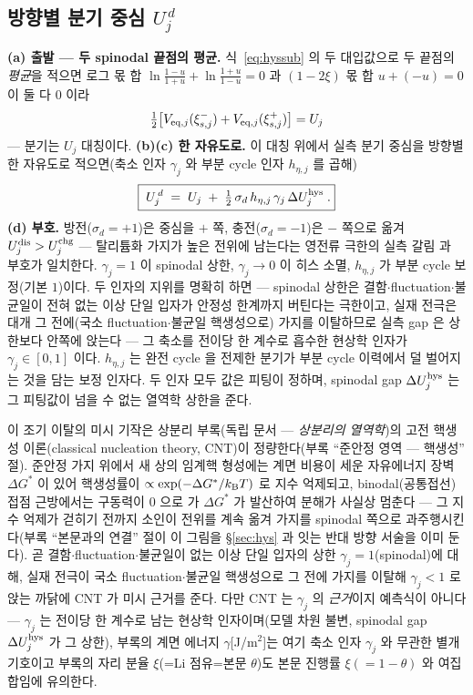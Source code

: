 \subsection{방향별 분기 중심 $U_j^{\,d}$}\label{sec:hys-branch}
\textbf{(a) 출발 --- 두 spinodal 끝점의 평균.} 식~\eqref{eq:hyssub} 의 두 대입값으로 두 끝점의 \emph{평균}을 적으면
로그 몫 합 $\ln\frac{1-u}{1+u}+\ln\frac{1+u}{1-u}=0$ 과 $(1-2\xi)$ 몫 합 $u+(-u)=0$ 이 둘 다 $0$ 이라
\begin{equation}
\tfrac12\big[V_{\mathrm{eq},j}(\xi_{s,j}^-)+V_{\mathrm{eq},j}(\xi_{s,j}^+)\big]=U_j
\label{eq:hyssym}
\end{equation}
--- 분기는 $U_j$ 대칭이다. \textbf{(b)(c) 한 자유도로.} 이 대칭 위에서 실측 분기 중심을 방향별 한 자유도로 적으면(축소
인자 $\gamma_j$ 와 부분 cycle 인자 $h_{\eta,j}$ 를 곱해)
\begin{equation}
\boxed{\;U_j^{\,d}\;=\;U_j\;+\;\tfrac12\,\sigma_d\,h_{\eta,j}\,\gamma_j\,\Delta U_j^{\mathrm{hys}}\;.}
\label{eq:Ubranch}
\end{equation}
\textbf{(d) 부호.} 방전($\sigma_d=+1$)은 중심을
$+$ 쪽, 충전($\sigma_d=-1$)은 $-$ 쪽으로 옮겨 $U_j^{\mathrm{dis}}>U_j^{\mathrm{chg}}$ --- 탈리튬화 가지가 높은 전위에
남는다는 영전류 극한의 실측 갈림\cite{dreyer2010} 과 부호가 일치한다.
$\gamma_j=1$ 이 spinodal 상한, $\gamma_j\to0$ 이 히스 소멸, $h_{\eta,j}$ 가 부분 cycle 보정(기본 $1$)이다.
두 인자의 지위를 명확히 하면 --- spinodal 상한은 결함$\cdot$fluctuation$\cdot$불균일이 전혀 없는 이상 단일 입자가
안정성 한계까지 버틴다는 극한이고, 실재 전극은 대개 그 전에(국소 fluctuation$\cdot$불균일 핵생성으로) 가지를
이탈하므로 실측 gap 은 상한보다 안쪽에 앉는다 --- 그 축소를 전이당 한 계수로 흡수한 현상학 인자가
$\gamma_j\in[0,1]$ 이다. $h_{\eta,j}$ 는 완전 cycle 을 전제한 분기가 부분 cycle 이력에서 덜 벌어지는 것을
담는 보정 인자다. 두 인자 모두 값은 피팅이 정하며, spinodal gap $\Delta U_j^{\mathrm{hys}}$ 는 그 피팅값이 넘을 수
없는 열역학 상한을 준다.

이 조기 이탈의 미시 기작은 상분리 부록(독립 문서 --- \emph{상분리의 열역학})의 고전 핵생성
이론(classical nucleation theory, CNT)이 정량한다(부록 ``준안정 영역 --- 핵생성'' 절). 준안정
가지 위에서 새 상의 임계핵 형성에는 계면 비용이 세운 자유에너지 장벽 $\Delta G^\ast$ 이 있어
핵생성률이 $\propto\exp(-\Delta G^\ast/k_{\mathrm B} T)$ 로 지수 억제되고, binodal(공통접선) 접점 근방에서는
구동력이 $0$ 으로 가 $\Delta G^\ast$ 가 발산하여 분해가 사실상 멈춘다 --- 그 지수 억제가 걷히기
전까지 소인이 전위를 계속 옮겨 가지를 spinodal 쪽으로 과주행시킨다(부록 ``본문과의 연결'' 절이 이
그림을 \S\ref{sec:hys} 과 잇는 반대 방향 서술을 이미 둔다). 곧 결함$\cdot$fluctuation$\cdot$불균일이 없는
이상 단일 입자의 상한 $\gamma_j=1$(spinodal)에 대해, 실재 전극이 국소 fluctuation$\cdot$불균일 핵생성으로
그 전에 가지를 이탈해 $\gamma_j<1$ 로 앉는 까닭에 CNT 가 미시 근거를 준다. 다만 CNT 는 $\gamma_j$ 의
\emph{근거}이지 예측식이 아니다 --- $\gamma_j$ 는 전이당 한 계수로 남는 현상학 인자이며(모델 차원
불변, spinodal gap $\Delta U_j^{\mathrm{hys}}$ 가 그 상한), 부록의 계면 에너지 $\gamma$[J/m$^2$]는 여기 축소
인자 $\gamma_j$ 와 무관한 별개 기호이고 부록의 자리 분율 $\xi$(=Li 점유=본문 $\theta$)도 본문 진행률
$\xi(=1-\theta)$ 와 여집합임에 유의한다.

